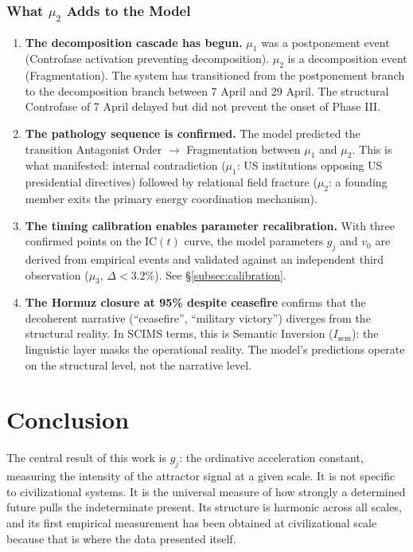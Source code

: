 \documentclass[12pt,a4paper]{article}
\newcommand{\gj}{g_j}
\newcommand{\IC}{\mathrm{IC}}
\begin{document}
\subsubsection{What $\mu_2$ Adds to the Model}

\begin{enumerate}[leftmargin=2em]
    \item \textbf{The decomposition cascade has begun.} $\mu_1$ was a postponement event (Controfase activation preventing decomposition). $\mu_2$ is a decomposition event (Fragmentation). The system has transitioned from the postponement branch to the decomposition branch between 7 April and 29 April. The structural Controfase of 7 April delayed but did not prevent the onset of Phase III.
    \item \textbf{The pathology sequence is confirmed.} The model predicted the transition Antagonist Order $\to$ Fragmentation between $\mu_1$ and $\mu_2$. This is what manifested: internal contradiction ($\mu_1$: US institutions opposing US presidential directives) followed by relational field fracture ($\mu_2$: a founding member exits the primary energy coordination mechanism).
    \item \textbf{The timing calibration enables parameter recalibration.} With three confirmed points on the $\IC(t)$ curve, the model parameters $\gj$ and $v_0$ are derived from empirical events and validated against an independent third observation ($\mu_3$, $\Delta < 3.2\%$). See \S\ref{subsec:calibration}.
    \item \textbf{The Hormuz closure at 95\% despite ceasefire} confirms that the decoherent narrative (``ceasefire'', ``military victory'') diverges from the structural reality. In SCIMS terms, this is Semantic Inversion ($I_{\mathrm{sem}}$): the linguistic layer masks the operational reality. The model's predictions operate on the structural level, not the narrative level.
\end{enumerate}


\section{Conclusion}

The central result of this work is $\gj$: the ordinative acceleration constant, measuring the intensity of the attractor signal at a given scale. It is not specific to civilizational systems. It is the universal measure of how strongly a determined future pulls the indeterminate present. Its structure is harmonic across all scales, and its first empirical measurement has been obtained at civilizational scale because that is where the data presented itself.
\end{document}
